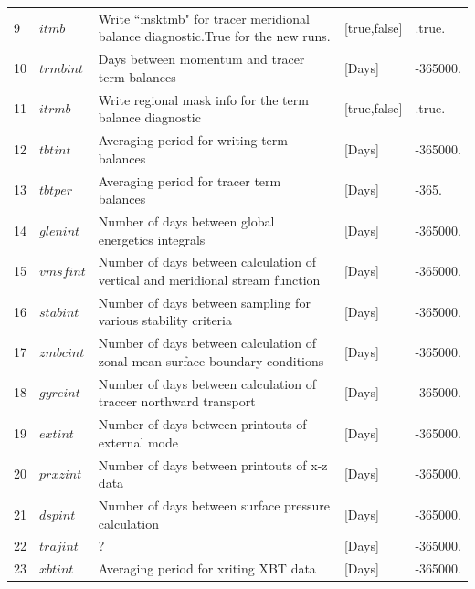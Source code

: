 \documentclass[a4paper]{article}
\begin{document}
\begin{itemize}
{\begin{longtable}{lllll}
  9    & $itmb$      & Write ``msktmb" for tracer meridional balance diagnostic.True for the new runs.  & [true,false]       & .true.   \\
  10   & $trmbint$   & Days between momentum and tracer term balances                                   & [Days]             & -365000.         \\
  11   & $itrmb$     & Write regional mask info for the term balance diagnostic                         & [true,false]       & .true.   \\
  12   & $tbtint$    & Averaging period for writing term balances                                       & [Days]             & -365000.   \\
  13   & $tbtper$    & Averaging period for tracer term balances                                        & [Days]             & -365.      \\
  14   & $glenint$   & Number of days between global energetics integrals                               & [Days]             & -365000.    \\
  15   & $vmsfint$   & Number of days between calculation of vertical and meridional stream function    & [Days]             & -365000.     \\
  16   & $stabint$   & Number of days between sampling for various stability criteria                   & [Days]             & -365000.    \\
  17   & $zmbcint$   & Number of days between calculation of zonal mean surface boundary conditions     & [Days]             & -365000.    \\
  18   & $gyreint$   & Number of days between calculation of traccer northward transport                & [Days]             & -365000.   \\
  19   & $extint$    & Number of days between printouts of external mode                                & [Days]             & -365000.   \\
  20   & $prxzint$   & Number of days between printouts of x-z data                                     & [Days]             & -365000.    \\
  21   & $dspint$    & Number of days between surface pressure calculation                              & [Days]             & -365000.    \\
  22   & $trajint$   & ?                                                                                & [Days]             & -365000.    \\
  23   & $xbtint$    & Averaging period for xriting XBT data                                            & [Days]             & -365000.   \\ \hline
  

\end{longtable}}
\end{itemize}
\end{document}
